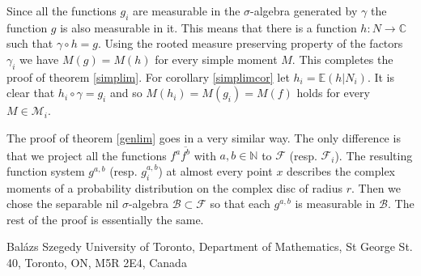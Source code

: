 \documentclass [11pt] {article}
\begin{document}
Since all the functions $g_i$ are measurable in the $\sigma$-algebra generated by $\gamma$ the function $g$ is also measurable in it. This means that there is a function $h:N\rightarrow\mathbb{C}$ such that $\gamma\circ h=g$.
Using the rooted measure preserving property of the factors $\gamma_i$ we have $M(g)=M(h)$ for every simple moment $M$.
This completes the proof of theorem \ref{simplim}. For corollary \ref{simplimcor} let $h_i=\mathbb{E}(h|N_i)$. It is clear that $h_i\circ\gamma=g_i$ and so $M(h_i)=M(g_i)=M(f)$ holds for every $M\in\mathcal{M}_i$.

\bigskip

The proof of theorem \ref{genlim} goes in a very similar way. The only difference is that we project all the functions $f^a\overline{f^b}$ with $a,b\in\mathbb{N}$ to $\mathcal{F}$ (resp. $\mathcal{F}_i$). The resulting function system $g^{a,b}$ (resp. $g^{a,b}_i$) at almost every point $x$ describes the complex moments of a probability distribution on the complex disc of radius $r$. Then we chose the separable nil $\sigma$-algebra $\mathcal{B}\subset\mathcal{F}$ so that each $g^{a,b}$ is measurable in $\mathcal{B}$. The rest of the proof is essentially the same.






 























 






\vskip 0.2in

\noindent
Bal\'azs Szegedy
\noindent
University of Toronto, Department of Mathematics,
\noindent
St George St. 40, Toronto, ON, M5R 2E4, Canada
\end{document}
